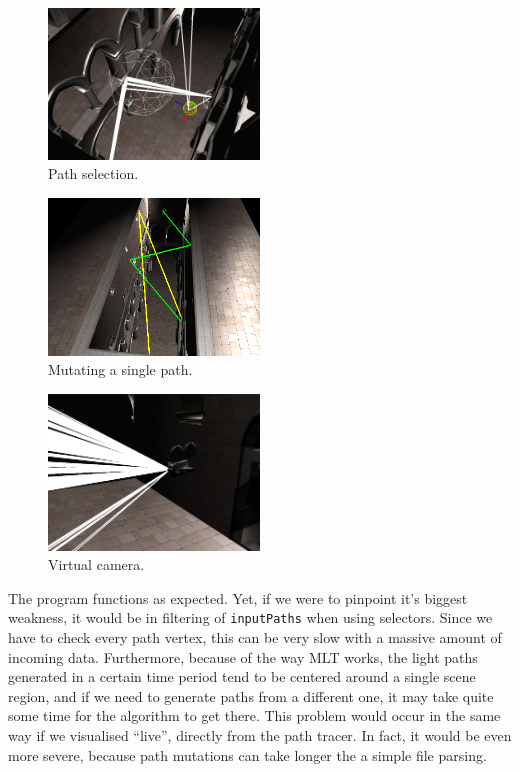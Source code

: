 \begin{figure}[h]
    \centering
    \includegraphics[width=0.5\textwidth]{selection.png}
    \caption{Path selection.}
\end{figure}

\begin{figure}[h]
    \centering
    \includegraphics[width=0.5\textwidth]{single.png}
    \caption{Mutating a single path.}
\end{figure}

\begin{figure}[h]
    \centering
    \includegraphics[width=0.5\textwidth]{camera.png}
    \caption{Virtual camera.}
\end{figure}

The program functions as expected. Yet, if we were to pinpoint it's biggest weakness, it would be in filtering of \texttt{inputPaths} when using selectors. Since we have to check every path vertex, this can be very slow with a massive amount of incoming data. Furthermore, because of the way MLT works, the light paths generated in a certain time period tend to be centered around a single scene region, and if we need to generate paths from a different one, it may take quite some time for the algorithm to get there. This problem would occur in the same way if we visualised ``live'', directly from the path tracer. In fact, it would be even more severe, because path mutations can take longer the a simple file parsing. 